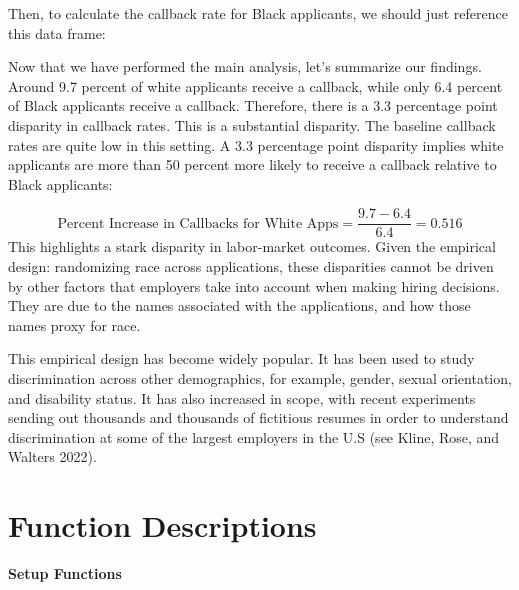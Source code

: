 \documentclass[
]{book}
\newenvironment{Shaded}{\begin{snugshade}}{\end{snugshade}}
\newcommand{\DecValTok}[1]{\textcolor[rgb]{0.00,0.00,0.81}{#1}}
\newcommand{\FloatTok}[1]{\textcolor[rgb]{0.00,0.00,0.81}{#1}}
\newcommand{\FunctionTok}[1]{\textcolor[rgb]{0.13,0.29,0.53}{\textbf{#1}}}
\newcommand{\NormalTok}[1]{#1}
\newcommand{\SpecialCharTok}[1]{\textcolor[rgb]{0.81,0.36,0.00}{\textbf{#1}}}
\begin{document}
Then, to calculate the callback rate for Black applicants, we should just reference this data frame:

\begin{Shaded}
\end{Shaded}

Now that we have performed the main analysis, let's summarize our findings. Around 9.7 percent of white applicants receive a callback, while only 6.4 percent of Black applicants receive a callback. Therefore, there is a 3.3 percentage point disparity in callback rates. This is a substantial disparity. The baseline callback rates are quite low in this setting. A 3.3 percentage point disparity implies white applicants are more than 50 percent more likely to receive a callback relative to Black applicants:

\[
\text{Percent Increase in Callbacks for White Apps}=\frac{9.7-6.4}{6.4}=0.516
\]
This highlights a stark disparity in labor-market outcomes. Given the empirical design: randomizing race across applications, these disparities cannot be driven by other factors that employers take into account when making hiring decisions. They are due to the names associated with the applications, and how those names proxy for race.

This empirical design has become widely popular. It has been used to study discrimination across other demographics, for example, gender, sexual orientation, and disability status. It has also increased in scope, with recent experiments sending out thousands and thousands of fictitious resumes in order to understand discrimination at some of the largest employers in the U.S (see Kline, Rose, and Walters 2022).\citep{kline2021systemic}

\section*{Function Descriptions}\label{function-descriptions}

\textbf{Setup Functions}
\end{document}
